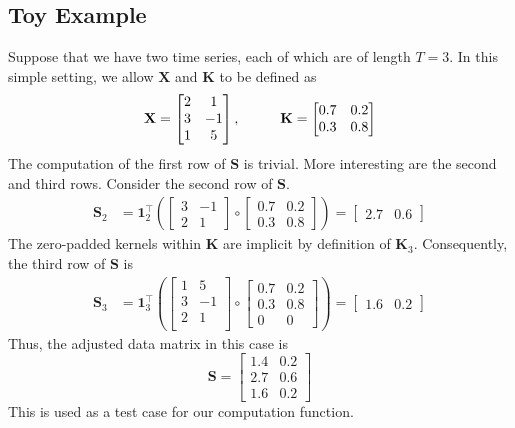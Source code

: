 \documentclass{article}
\begin{document}
\subsection*{Toy Example}
Suppose that we have two time series, each of which are of length $T = 3$. In this simple setting, we allow $\mathbf{X}$ and $\mathbf{K}$ to be defined as
$$
\mathbf{X} = \begin{bmatrix}
	2 & 1 \\ 3 & -1 \\ 1 & 5
\end{bmatrix}, \hspace{1.0cm} \mathbf{K} = \begin{bmatrix}
0.7 & 0.2 \\ 0.3 & 0.8 
\end{bmatrix}
$$
The computation of the first row of $\mathbf{S}$ is trivial. More interesting are the second and third rows. Consider the second row of $\mathbf{S}$.
\begin{align*}
	\mathbf{S}_{2} &=  \mathbf{1}_2^{\top}\left( \begin{bmatrix}
		3 & -1  \\ 2 & 1 
	\end{bmatrix} \circ \begin{bmatrix}
		0.7 & 0.2 \\ 0.3 & 0.8 
	\end{bmatrix} \right) = \begin{bmatrix}
	2.7 & 0.6
	\end{bmatrix}
\end{align*}
The zero-padded kernels within $\mathbf{K}$ are implicit by definition of $\mathbf{K}_3$. Consequently, the third row of $\mathbf{S}$ is
\begin{align*}
	\mathbf{S}_{3} &=  \mathbf{1}_3^{\top}\left( \begin{bmatrix}
	1 & 5	\\ 3 & -1  \\ 2 & 1 \\ 
	\end{bmatrix} \circ \begin{bmatrix}
		0.7 & 0.2 \\ 0.3 & 0.8  \\ 0 & 0 
	\end{bmatrix} \right) = \begin{bmatrix}
		1.6 & 0.2
	\end{bmatrix} 
\end{align*}
Thus, the adjusted data matrix in this case is
$$
\mathbf{S} = \begin{bmatrix} 1.4 & 0.2 \\ 2.7 & 0.6 \\ 1.6 & 0.2\end{bmatrix}
$$
This is used as a test case for our computation function.
\end{document}
